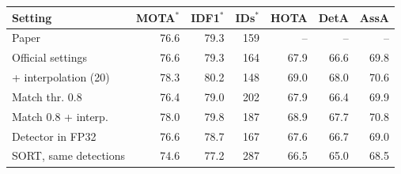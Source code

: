 \begin{tabular}{lrrrrrr}
\toprule
Setting & MOTA$^*$ & IDF1$^*$ & IDs$^*$ & HOTA & DetA & AssA \\
\midrule
Paper~\cite{zhang2022bytetrack} & 76.6 & 79.3 & 159 & -- & -- & -- \\
\midrule
Official settings & 76.6 & 79.3 & 164 & 67.9 & 66.6 & 69.8 \\
+ interpolation (20) & 78.3 & 80.2 & 148 & 69.0 & 68.0 & 70.6 \\
Match thr. 0.8 & 76.4 & 79.0 & 202 & 67.9 & 66.4 & 69.9 \\
Match 0.8 + interp. & 78.0 & 79.8 & 187 & 68.9 & 67.7 & 70.8 \\
Detector in FP32 & 76.6 & 78.7 & 167 & 67.6 & 66.7 & 69.0 \\
SORT, same detections & 74.6 & 77.2 & 287 & 66.5 & 65.0 & 68.5 \\
\bottomrule
\end{tabular}
